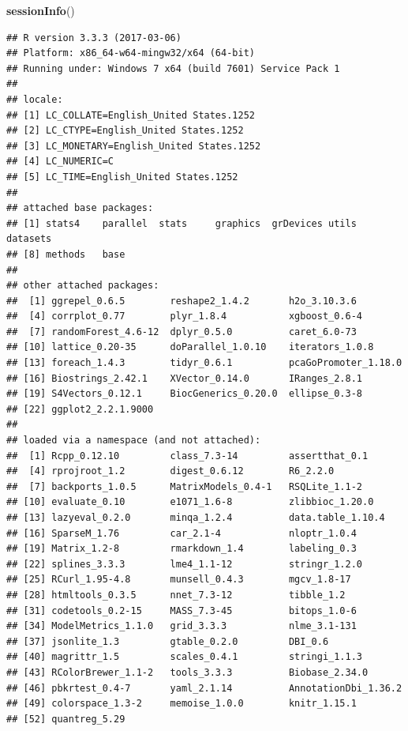 \documentclass[]{article}
\newenvironment{Shaded}{\begin{snugshade}}{\end{snugshade}}
\newcommand{\KeywordTok}[1]{\textcolor[rgb]{0.13,0.29,0.53}{\textbf{{#1}}}}
\newcommand{\NormalTok}[1]{{#1}}
\begin{document}
\begin{Shaded}
\begin{Highlighting}[]
\KeywordTok{sessionInfo}\NormalTok{()}
\end{Highlighting}
\end{Shaded}

\begin{verbatim}
## R version 3.3.3 (2017-03-06)
## Platform: x86_64-w64-mingw32/x64 (64-bit)
## Running under: Windows 7 x64 (build 7601) Service Pack 1
## 
## locale:
## [1] LC_COLLATE=English_United States.1252 
## [2] LC_CTYPE=English_United States.1252   
## [3] LC_MONETARY=English_United States.1252
## [4] LC_NUMERIC=C                          
## [5] LC_TIME=English_United States.1252    
## 
## attached base packages:
## [1] stats4    parallel  stats     graphics  grDevices utils     datasets 
## [8] methods   base     
## 
## other attached packages:
##  [1] ggrepel_0.6.5        reshape2_1.4.2       h2o_3.10.3.6        
##  [4] corrplot_0.77        plyr_1.8.4           xgboost_0.6-4       
##  [7] randomForest_4.6-12  dplyr_0.5.0          caret_6.0-73        
## [10] lattice_0.20-35      doParallel_1.0.10    iterators_1.0.8     
## [13] foreach_1.4.3        tidyr_0.6.1          pcaGoPromoter_1.18.0
## [16] Biostrings_2.42.1    XVector_0.14.0       IRanges_2.8.1       
## [19] S4Vectors_0.12.1     BiocGenerics_0.20.0  ellipse_0.3-8       
## [22] ggplot2_2.2.1.9000  
## 
## loaded via a namespace (and not attached):
##  [1] Rcpp_0.12.10         class_7.3-14         assertthat_0.1      
##  [4] rprojroot_1.2        digest_0.6.12        R6_2.2.0            
##  [7] backports_1.0.5      MatrixModels_0.4-1   RSQLite_1.1-2       
## [10] evaluate_0.10        e1071_1.6-8          zlibbioc_1.20.0     
## [13] lazyeval_0.2.0       minqa_1.2.4          data.table_1.10.4   
## [16] SparseM_1.76         car_2.1-4            nloptr_1.0.4        
## [19] Matrix_1.2-8         rmarkdown_1.4        labeling_0.3        
## [22] splines_3.3.3        lme4_1.1-12          stringr_1.2.0       
## [25] RCurl_1.95-4.8       munsell_0.4.3        mgcv_1.8-17         
## [28] htmltools_0.3.5      nnet_7.3-12          tibble_1.2          
## [31] codetools_0.2-15     MASS_7.3-45          bitops_1.0-6        
## [34] ModelMetrics_1.1.0   grid_3.3.3           nlme_3.1-131        
## [37] jsonlite_1.3         gtable_0.2.0         DBI_0.6             
## [40] magrittr_1.5         scales_0.4.1         stringi_1.1.3       
## [43] RColorBrewer_1.1-2   tools_3.3.3          Biobase_2.34.0      
## [46] pbkrtest_0.4-7       yaml_2.1.14          AnnotationDbi_1.36.2
## [49] colorspace_1.3-2     memoise_1.0.0        knitr_1.15.1        
## [52] quantreg_5.29
\end{verbatim}
\end{document}
